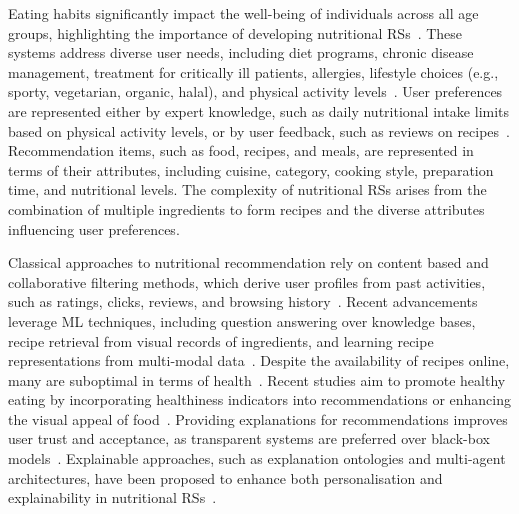 Eating habits significantly impact the well-being of individuals across all age groups, highlighting the importance of developing nutritional \glspl{RS}~\cite{EspinHN2016,Cioara2018,Shandilya2022}.
%
These systems address diverse user needs, including diet programs, chronic disease management, treatment for critically ill patients, allergies, lifestyle choices (e.g., sporty, vegetarian, organic, halal), and physical activity levels~\cite{Saiz2021,Hezarjaribi2019,AgapitoSCCLGPFC2018,FraserT1990,Tran2018}.
%
User preferences are represented either by expert knowledge, such as daily nutritional intake limits based on physical activity levels, or by user feedback, such as reviews on recipes~\cite{10.1145/3418211}.
%
Recommendation items, such as food, recipes, and meals, are represented in terms of their attributes, including cuisine, category, cooking style, preparation time, and nutritional levels.
%
The complexity of nutritional \glspl{RS} arises from the combination of multiple ingredients to form recipes and the diverse attributes influencing user preferences.

Classical approaches to nutritional recommendation rely on content based and collaborative filtering methods, which derive user profiles from past activities, such as ratings, clicks, reviews, and browsing history~\cite{Min2020}.
%
Recent advancements leverage \gls{ML} techniques, including question answering over knowledge bases, recipe retrieval from visual records of ingredients, and learning recipe representations from multi-modal data~\cite{Forbes2011,Bianchini2017,Freyne2010,Chen2021,Tian2022}.
%
Despite the availability of recipes online, many are suboptimal in terms of health~\cite{Trattner2017a}.
%
Recent studies aim to promote healthy eating by incorporating healthiness indicators into recommendations or enhancing the visual appeal of food~\cite{Saiz2021,10.1145/3418211}.
%
Providing explanations for recommendations improves user trust and acceptance, as transparent systems are preferred over black-box models~\cite{Anjomshoae2019}.
%
Explainable approaches, such as explanation ontologies and multi-agent architectures, have been proposed to enhance both personalisation and explainability in nutritional \glspl{RS}~\cite{DBLP:conf/icde/PadhiarSCGM21,Yera2022,expectation-extraamas2021}.

